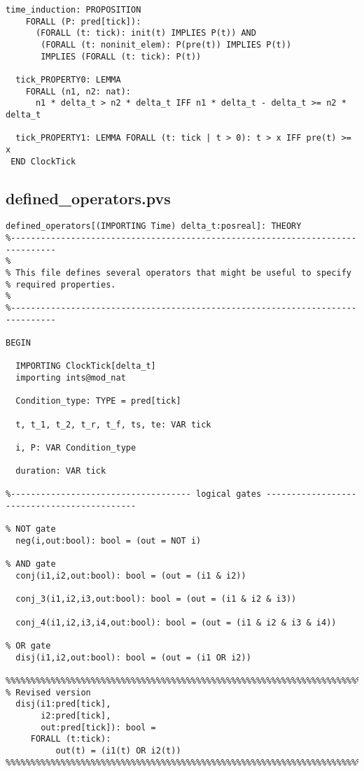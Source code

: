 \begin{singlespace}
\begin{lstlisting}[tabsize=2, language=PVS]
  time_induction: PROPOSITION
    FORALL (P: pred[tick]):
      (FORALL (t: tick): init(t) IMPLIES P(t)) AND
       (FORALL (t: noninit_elem): P(pre(t)) IMPLIES P(t))
       IMPLIES (FORALL (t: tick): P(t))

  tick_PROPERTY0: LEMMA
    FORALL (n1, n2: nat):
      n1 * delta_t > n2 * delta_t IFF n1 * delta_t - delta_t >= n2 * delta_t

  tick_PROPERTY1: LEMMA FORALL (t: tick | t > 0): t > x IFF pre(t) >= x
 END ClockTick

\end{lstlisting}

\subsection{defined\_operators.pvs} \label{app:schedex:pvslib:ops}

\begin{lstlisting}[tabsize=2, language=PVS]
defined_operators[(IMPORTING Time) delta_t:posreal]: THEORY
%-------------------------------------------------------------------------------
%
% This file defines several operators that might be useful to specify
% required properties.
%
%-------------------------------------------------------------------------------

BEGIN

  IMPORTING ClockTick[delta_t]
  importing ints@mod_nat

  Condition_type: TYPE = pred[tick]

  t, t_1, t_2, t_r, t_f, ts, te: VAR tick

  i, P: VAR Condition_type

  duration: VAR tick

%------------------------------------ logical gates --------------------------------------------

% NOT gate
  neg(i,out:bool): bool = (out = NOT i)

% AND gate
  conj(i1,i2,out:bool): bool = (out = (i1 & i2))

  conj_3(i1,i2,i3,out:bool): bool = (out = (i1 & i2 & i3))

  conj_4(i1,i2,i3,i4,out:bool): bool = (out = (i1 & i2 & i3 & i4))

% OR gate
  disj(i1,i2,out:bool): bool = (out = (i1 OR i2))

%%%%%%%%%%%%%%%%%%%%%%%%%%%%%%%%%%%%%%%%%%%%%%%%%%%%%%%%%%%%%%%%%%%%%%%%%
% Revised version
  disj(i1:pred[tick],
       i2:pred[tick],
       out:pred[tick]): bool =
     FORALL (t:tick):
          out(t) = (i1(t) OR i2(t))
%%%%%%%%%%%%%%%%%%%%%%%%%%%%%%%%%%%%%%%%%%%%%%%%%%%%%%%%%%%%%%%%%%%%%%%%%


\end{lstlisting}
\end{singlespace}
